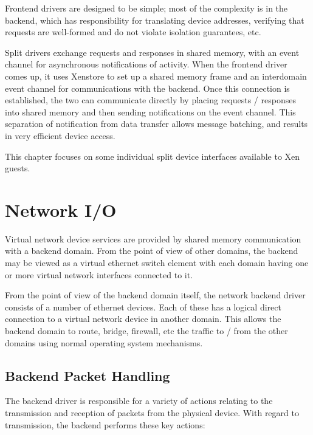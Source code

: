 \documentclass[11pt,twoside,final,openright]{report}
\begin{document}
Frontend drivers are designed to be simple; most of the complexity is
in the backend, which has responsibility for translating device
addresses, verifying that requests are well-formed and do not violate
isolation guarantees, etc.

Split drivers exchange requests and responses in shared memory, with
an event channel for asynchronous notifications of activity.  When the
frontend driver comes up, it uses Xenstore to set up a shared memory
frame and an interdomain event channel for communications with the
backend.  Once this connection is established, the two can communicate
directly by placing requests / responses into shared memory and then
sending notifications on the event channel.  This separation of
notification from data transfer allows message batching, and results
in very efficient device access.

This chapter focuses on some individual split device interfaces
available to Xen guests.

        
\section{Network I/O}

Virtual network device services are provided by shared memory
communication with a backend domain.  From the point of view of other
domains, the backend may be viewed as a virtual ethernet switch
element with each domain having one or more virtual network interfaces
connected to it.

From the point of view of the backend domain itself, the network
backend driver consists of a number of ethernet devices.  Each of
these has a logical direct connection to a virtual network device in
another domain.  This allows the backend domain to route, bridge,
firewall, etc the traffic to / from the other domains using normal
operating system mechanisms.

\subsection{Backend Packet Handling}

The backend driver is responsible for a variety of actions relating to
the transmission and reception of packets from the physical device.
With regard to transmission, the backend performs these key actions:
\end{document}
